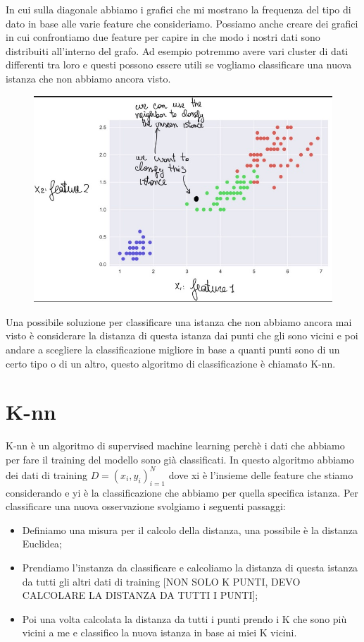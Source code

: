 \documentclass[14pt]{extreport}
\begin{document}
In cui sulla diagonale abbiamo i grafici che mi mostrano la frequenza del tipo di dato in base alle varie feature che consideriamo. Possiamo anche
creare dei grafici in cui confrontiamo due feature per capire in che modo i nostri dati sono distribuiti all’interno del grafo. Ad esempio potremmo
avere vari cluster di dati differenti tra loro e questi possono essere utili se vogliamo classificare una nuova istanza che non abbiamo ancora visto.


\begin{figure}[H]
	\centering
	\includegraphics[width=0.7\linewidth]{56.jpeg}
\end{figure}

Una possibile soluzione per classificare una istanza che non abbiamo ancora mai visto è considerare la distanza di questa istanza dai punti che gli
sono vicini e poi andare a scegliere la classificazione migliore in base a quanti punti sono di un certo tipo o di un altro, questo algoritmo di
classificazione è chiamato K-nn.

\section{K-nn}

K-nn è un algoritmo di supervised machine learning perchè i dati che abbiamo per fare il training del modello sono già classificati. In questo
algoritmo abbiamo dei dati di training $D = {(x_i, y_i)}^N_{i=1}$ dove xi è l’insieme delle feature che stiamo considerando e yi è la classificazione
che abbiamo per quella specifica istanza. Per classificare una nuova osservazione svolgiamo i seguenti passaggi:
\begin{itemize}
	\item Definiamo una misura per il calcolo della distanza, una possibile è la distanza Euclidea;
	\item Prendiamo l’instanza da classificare e calcoliamo la distanza di questa istanza da tutti gli altri dati di training [NON SOLO K PUNTI, DEVO
	CALCOLARE LA DISTANZA DA TUTTI I PUNTI];
	\item Poi una volta calcolata la distanza da tutti i punti prendo i K che sono più vicini a me e classifico la nuova istanza in base ai miei K
	vicini.
\end{itemize}
\end{document}

